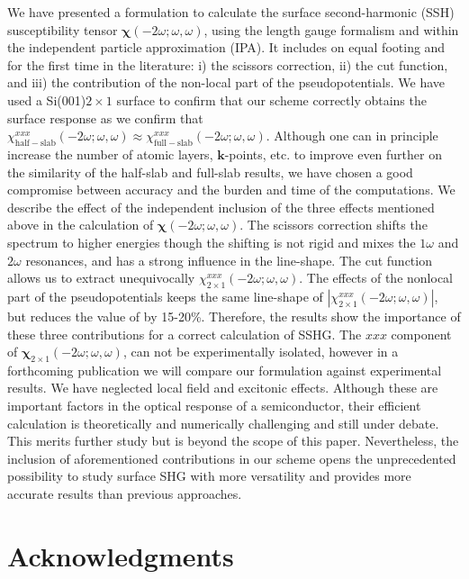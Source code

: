 \documentclass[floatfix,prb,aps,superscriptaddress,showpacs,letterpaper]{revtex4}
\begin{document}
We have presented a formulation to calculate the surface second-harmonic
(SSH) susceptibility tensor $\boldsymbol{\chi}(-2\omega;\omega,\omega)$, using the length gauge
formalism and within the independent particle approximation (IPA).
It includes on equal footing and for the first time in the literature: 
i) the scissors correction, ii) the cut function, and iii) the
contribution of the non-local part of the pseudopotentials.
We have used a Si(001)$2\times 1$ surface to confirm that our scheme
correctly obtains the surface response as we confirm
that 
$\chi_{\mathrm{half-slab}}^{xxx}(-2\omega;\omega,\omega) 
\approx
\chi_{\mathrm{full-slab}}^{xxx}(-2\omega;\omega,\omega) 
. 
$
Although one can in principle increase the number of atomic layers,
$\mathbf{k}$-points, etc. to
improve even further on the similarity of the half-slab and full-slab results, we
have chosen a good compromise between accuracy and the burden and time
of the computations. 
We describe the effect of the independent inclusion of the three
effects mentioned above in the calculation of  
$\boldsymbol{\chi}(-2\omega;\omega,\omega)$. 
The scissors correction shifts the spectrum to  
higher energies though the shifting is not rigid and mixes the 
$1\omega$ and $2\omega$ resonances,  
and has a strong influence in the line-shape.
 The cut function allows us  
to extract unequivocally $\chi^{xxx}_{2\times 1}(-2\omega;\omega,\omega)$.
 The effects of the nonlocal part of the pseudopotentials  
keeps the same line-shape of $|\chi^{xxx}_{2\times
  1}(-2\omega;\omega,\omega)|$,
but  
reduces the value of   
by 15-20\%. 
Therefore,  
the results show the importance of these three contributions for a correct calculation 
of SSHG.
The $xxx$ component of  
$\boldsymbol{\chi}_{2\times 1}(-2\omega;\omega,\omega)$, 
can not be
experimentally isolated,
however in a forthcoming publication 
we will compare our formulation 
against
experimental 
results. 
We have neglected
local field 
and excitonic effects.
Although these are important factors in the optical response of a semiconductor,
their efficient calculation is theoretically and 
numerically challenging and still 
under debate.\cite{beyond}  
This merits further study but is beyond the scope of this paper. 
Nevertheless, the inclusion of aforementioned contributions 
in
our scheme opens the unprecedented possibility to study 
surface SHG with more versatility and provides 
more accurate results than previous approaches. 

\section{Acknowledgments}
\end{document}
